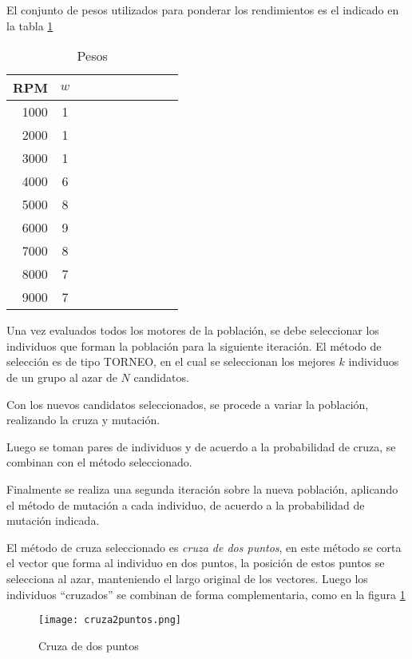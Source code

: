 El conjunto de pesos utilizados para ponderar los rendimientos es el indicado
en la tabla \ref{tab:pesos}

\begin{table}
  \centering
  \begin{tabular}{rccccccccc} \toprule
      RPM  & $w$ \\ \midrule
      1000 & 1 \\
      2000 & 1 \\
      3000 & 1 \\
      4000 & 6 \\
      5000 & 8 \\
      6000 & 9 \\
      7000 & 8 \\
      8000 & 7 \\
      9000 & 7 \\ \bottomrule
  \end{tabular}
  \caption{Pesos}
  \label{tab:pesos}
\end{table}


Una vez evaluados todos los motores de la población, se debe seleccionar los
individuos que forman la población para la siguiente iteración.
%
El método de selección es de tipo TORNEO, en el cual se seleccionan los mejores
$k$ individuos de un grupo al azar de $N$ candidatos.
%

Con los nuevos candidatos seleccionados, se procede a variar la población,
realizando la cruza y mutación.

Luego se toman pares de individuos y de acuerdo a la probabilidad de cruza, se
combinan con el método seleccionado.

Finalmente se realiza una segunda iteración sobre la nueva población, aplicando
el método de mutación a cada individuo, de acuerdo a la probabilidad de
mutación indicada.


El método de cruza seleccionado es \emph{cruza de dos puntos}, en este método
se corta el vector que forma al individuo en dos puntos, la posición de estos
puntos se selecciona al azar, manteniendo el largo original de los vectores.
%
Luego los individuos ``cruzados'' se combinan de forma complementaria, como en
la figura \ref{fig:cr2puntos}

\begin{figure}
  \centering
  \texttt{[image: cruza2puntos.png]}
  \caption{Cruza de dos puntos}
  \label{fig:cr2puntos}
\end{figure}

